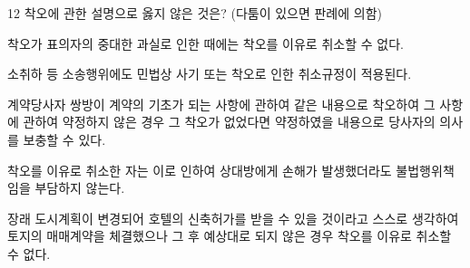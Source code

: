 \begin{question}{12}
착오에 관한 설명으로 옳지 않은 것은? (다툼이 있으면 판례에 의함)
\begin{choices}
  \item 착오가 표의자의 중대한 과실로 인한 때에는 착오를 이유로 취소할 수 없다.
  \item 소취하 등 소송행위에도 민법상 사기 또는 착오로 인한 취소규정이 적용된다.
  \item 계약당사자 쌍방이 계약의 기초가 되는 사항에 관하여 같은 내용으로 착오하여 그 사항에 관하여 약정하지 않은 경우 그 착오가 없었다면 약정하였을 내용으로 당사자의 의사를 보충할 수 있다.
  \item 착오를 이유로 취소한 자는 이로 인하여 상대방에게 손해가 발생했더라도 불법행위책임을 부담하지 않는다.
  \item 장래 도시계획이 변경되어 호텔의 신축허가를 받을 수 있을 것이라고 스스로 생각하여 토지의 매매계약을 체결했으나 그 후 예상대로 되지 않은 경우 착오를 이유로 취소할 수 없다.
\end{choices}
\end{question}
